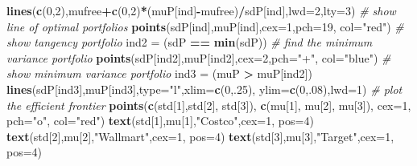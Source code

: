 \documentclass[]{article}
\newenvironment{Shaded}{\begin{snugshade}}{\end{snugshade}}
\newcommand{\CommentTok}[1]{\textcolor[rgb]{0.56,0.35,0.01}{\textit{#1}}}
\newcommand{\DataTypeTok}[1]{\textcolor[rgb]{0.13,0.29,0.53}{#1}}
\newcommand{\DecValTok}[1]{\textcolor[rgb]{0.00,0.00,0.81}{#1}}
\newcommand{\KeywordTok}[1]{\textcolor[rgb]{0.13,0.29,0.53}{\textbf{#1}}}
\newcommand{\NormalTok}[1]{#1}
\newcommand{\OperatorTok}[1]{\textcolor[rgb]{0.81,0.36,0.00}{\textbf{#1}}}
\newcommand{\StringTok}[1]{\textcolor[rgb]{0.31,0.60,0.02}{#1}}
\begin{document}
\begin{Shaded}
\begin{Highlighting}[]
\KeywordTok{lines}\NormalTok{(}\KeywordTok{c}\NormalTok{(}\DecValTok{0}\NormalTok{,}\DecValTok{2}\NormalTok{),mufree}\OperatorTok{+}\KeywordTok{c}\NormalTok{(}\DecValTok{0}\NormalTok{,}\DecValTok{2}\NormalTok{)}\OperatorTok{*}\NormalTok{(muP[ind]}\OperatorTok{-}\NormalTok{mufree)}\OperatorTok{/}\NormalTok{sdP[ind],}\DataTypeTok{lwd=}\DecValTok{2}\NormalTok{,}\DataTypeTok{lty=}\DecValTok{3}\NormalTok{)}
\CommentTok{# show line of optimal portfolios}
\KeywordTok{points}\NormalTok{(sdP[ind],muP[ind],}\DataTypeTok{cex=}\DecValTok{1}\NormalTok{,}\DataTypeTok{pch=}\DecValTok{19}\NormalTok{, }\DataTypeTok{col=}\StringTok{"red"}\NormalTok{) }\CommentTok{# show tangency portfolio}
\NormalTok{ind2 =}\StringTok{ }\NormalTok{(sdP }\OperatorTok{==}\StringTok{ }\KeywordTok{min}\NormalTok{(sdP)) }\CommentTok{# find the minimum variance portfolio}
\KeywordTok{points}\NormalTok{(sdP[ind2],muP[ind2],}\DataTypeTok{cex=}\DecValTok{2}\NormalTok{,}\DataTypeTok{pch=}\StringTok{"+"}\NormalTok{, }\DataTypeTok{col=}\StringTok{"blue"}\NormalTok{) }\CommentTok{# show minimum variance portfolio}
\NormalTok{ind3 =}\StringTok{ }\NormalTok{(muP }\OperatorTok{>}\StringTok{ }\NormalTok{muP[ind2])}
\KeywordTok{lines}\NormalTok{(sdP[ind3],muP[ind3],}\DataTypeTok{type=}\StringTok{"l"}\NormalTok{,}\DataTypeTok{xlim=}\KeywordTok{c}\NormalTok{(}\DecValTok{0}\NormalTok{,.}\DecValTok{25}\NormalTok{),}
      \DataTypeTok{ylim=}\KeywordTok{c}\NormalTok{(}\DecValTok{0}\NormalTok{,.}\DecValTok{08}\NormalTok{),}\DataTypeTok{lwd=}\DecValTok{1}\NormalTok{)  }\CommentTok{#  plot the efficient frontier}
\KeywordTok{points}\NormalTok{(}\KeywordTok{c}\NormalTok{(std[}\DecValTok{1}\NormalTok{],std[}\DecValTok{2}\NormalTok{], std[}\DecValTok{3}\NormalTok{]), }\KeywordTok{c}\NormalTok{(mu[}\DecValTok{1}\NormalTok{], mu[}\DecValTok{2}\NormalTok{], mu[}\DecValTok{3}\NormalTok{]), }\DataTypeTok{cex=}\DecValTok{1}\NormalTok{, }\DataTypeTok{pch=}\StringTok{"o"}\NormalTok{, }\DataTypeTok{col=}\StringTok{"red"}\NormalTok{) }
\KeywordTok{text}\NormalTok{(std[}\DecValTok{1}\NormalTok{],mu[}\DecValTok{1}\NormalTok{],}\StringTok{"Costco"}\NormalTok{,}\DataTypeTok{cex=}\DecValTok{1}\NormalTok{, }\DataTypeTok{pos=}\DecValTok{4}\NormalTok{)}
\KeywordTok{text}\NormalTok{(std[}\DecValTok{2}\NormalTok{],mu[}\DecValTok{2}\NormalTok{],}\StringTok{"Wallmart"}\NormalTok{,}\DataTypeTok{cex=}\DecValTok{1}\NormalTok{, }\DataTypeTok{pos=}\DecValTok{4}\NormalTok{)}
\KeywordTok{text}\NormalTok{(std[}\DecValTok{3}\NormalTok{],mu[}\DecValTok{3}\NormalTok{],}\StringTok{"Target"}\NormalTok{,}\DataTypeTok{cex=}\DecValTok{1}\NormalTok{, }\DataTypeTok{pos=}\DecValTok{4}\NormalTok{)}
\end{Highlighting}
\end{Shaded}
\end{document}
